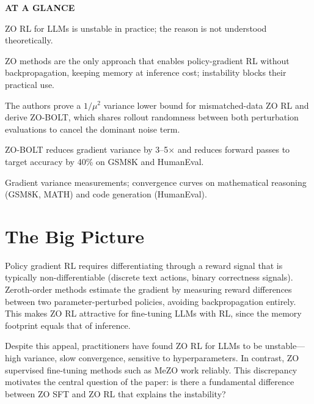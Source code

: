\documentclass[10pt,twocolumn]{article}
\begin{document}
\begin{mdframed}[backgroundcolor=boxgray,linecolor=rulered,linewidth=1pt,
    innerleftmargin=6pt,innerrightmargin=6pt,
    innertopmargin=6pt,innerbottommargin=6pt]
\textbf{\small AT A GLANCE}\par\vspace{4pt}
\begin{description}[leftmargin=0pt,labelsep=4pt,itemsep=2pt,parsep=0pt,
    font=\small\bfseries]
  \item[Problem:] ZO RL for LLMs is unstable in practice; the reason
    is not understood theoretically.
  \item[Why it matters:] ZO methods are the only approach that enables
    policy-gradient RL without backpropagation, keeping memory at
    inference cost; instability blocks their practical use.
  \item[Method:] The authors prove a $1/\mu^2$ variance lower bound for
    mismatched-data ZO RL and derive ZO-BOLT, which shares rollout
    randomness between both perturbation evaluations to cancel the
    dominant noise term.
  \item[Result:] ZO-BOLT reduces gradient variance by 3--5$\times$
    and reduces forward passes to target accuracy by 40\% on
    GSM8K and HumanEval.
  \item[Evidence:] Gradient variance measurements; convergence curves on
    mathematical reasoning (GSM8K, MATH) and code generation
    (HumanEval).
\end{description}
\end{mdframed}

\section{The Big Picture}

Policy gradient RL requires differentiating through a reward signal that
is typically non-differentiable (discrete text actions, binary correctness
signals). Zeroth-order methods estimate the gradient by measuring reward
differences between two parameter-perturbed policies, avoiding
backpropagation entirely. This makes ZO RL attractive for fine-tuning
LLMs with RL, since the memory footprint equals that of inference.

Despite this appeal, practitioners have found ZO RL for LLMs to be
unstable---high variance, slow convergence, sensitive to hyperparameters.
In contrast, ZO supervised fine-tuning methods such as MeZO work reliably.
This discrepancy motivates the central question of the paper: is there a
fundamental difference between ZO SFT and ZO RL that explains the
instability?
\end{document}
